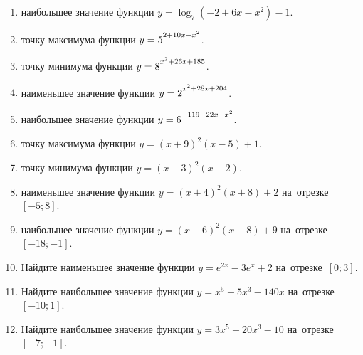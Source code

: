 \documentclass[a4paper,10pt]{article}
\begin{document}
\begin{enumerate}
\item {} наибольшее значение функции $y=\log_7\left(-2+6x-x^2\right)-1$.

\item {} точку максимума функции $y=5\strut^{2+10x-x^2}$.

\item {} точку минимума функции $y=8\strut^{x^2+26x+185}$.

\item {} наименьшее значение функции $y=2\strut^{x^2+28x+204}$.

\item {} наибольшее значение функции $y=6\strut^{-119-22x-x^2}$.

\item {} точку максимума функции $y=\left(x+9\right)^2\left(x-5\right)+1$.

\item {} точку минимума функции $y=\left(x-3\right)^2\left(x-2\right)$.

\item {} наименьшее значение функции $y=\left(x+4\right)^2\left(x+8\right)+2$ на~отрезке~$\left[-5;8\right]$.

\item {} наибольшее значение функции $y=\left(x+6\right)^2\left(x-8\right)+9$ на~отрезке~$\left[-18;-1\right]$.

\item Найдите наименьшее значение функции $y=e^{2x}-3e^x+2$ на~отрезке~$\left[0;3\right]$.

\item Найдите наибольшее значение функции $y=x^5+5x^3-140x$ на~отрезке~$\left[-10;1\right]$.

\item Найдите наибольшее значение функции $y=3x^5-20x^3-10$ на~отрезке~$\left[-7;-1\right]$.

\end{enumerate}
\end{document}
